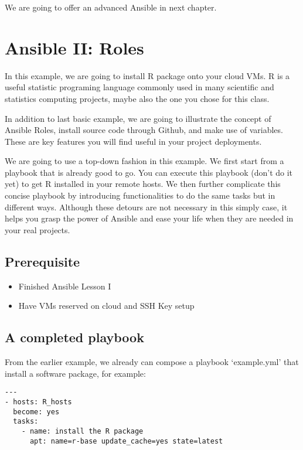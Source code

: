 We are going to offer an advanced Ansible in next chapter.
\section{Ansible II: Roles}\label{ansible-ii-roles}

In this example, we are going to install R package onto your cloud VMs.
R is a useful statistic programing language commonly used in many
scientific and statistics computing projects, maybe also the one you
chose for this class.

In addition to last basic example, we are going to illustrate the
concept of Ansible Roles, install source code through Github, and make
use of variables. These are key features you will find useful in your
project deployments.

We are going to use a top-down fashion in this example. We first start
from a playbook that is already good to go. You can execute this
playbook (don't do it yet) to get R installed in your remote hosts. We
then further complicate this concise playbook by introducing
functionalities to do the same tasks but in different ways. Although
these detours are not necessary in this simply case, it helps you grasp
the power of Ansible and ease your life when they are needed in your
real projects.

\subsection{Prerequisite}\label{prerequisite}

\begin{itemize}
\tightlist
\item
  Finished Ansible Lesson I
\item
  Have VMs reserved on cloud and SSH Key setup
\end{itemize}

\subsection{A completed playbook}\label{a-completed-playbook}

From the earlier example, we already can compose a playbook
`example.yml' that install a software package, for example:

\begin{verbatim}
---
- hosts: R_hosts
  become: yes
  tasks:
    - name: install the R package
      apt: name=r-base update_cache=yes state=latest
\end{verbatim}

